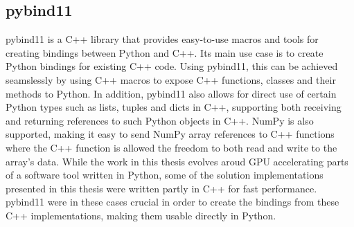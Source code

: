 \subsection{pybind11} \label{background:pybind11}
pybind11 \cite{pybind11} is a C++ library that provides easy-to-use macros and tools for creating bindings between Python and C++. 
Its main use case is to create Python bindings for existing C++ code.
Using pybind11, this can be achieved seamslessly by using C++ macros to expose C++ functions, classes and their methods to Python.
In addition, pybind11 also allows for direct use of certain Python types such as lists, tuples and dicts in C++, supporting both receiving and returning references to such Python objects in C++.
NumPy is also supported, making it easy to send NumPy array references to C++ functions where the C++ function is allowed the freedom to both read and write to the array's data.
While the work in this thesis evolves aroud GPU accelerating parts of a software tool written in Python, some of the solution implementations presented in this thesis were written partly in C++ for fast performance.
pybind11 were in these cases crucial in order to create the bindings from these C++ implementations, making them usable directly in Python.
